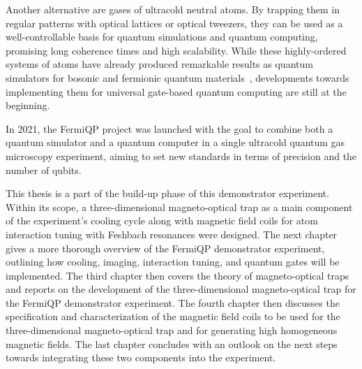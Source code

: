 Another alternative are gases of ultracold neutral atoms. By trapping them in regular patterns with optical lattices or optical tweezers, they can be used as a well-controllable basis for quantum simulations and quantum computing, promising long coherence times and high scalability. While these highly-ordered systems of atoms have already produced remarkable results as quantum simulators for bosonic and fermionic quantum materials~\cite{bloch_quantum_2012, gross_quantum_2017}, developments towards implementing them for universal gate-based quantum computing are still at the beginning.

In 2021, the FermiQP project was launched with the goal to combine both a quantum simulator and a quantum computer in a single ultracold quantum gas microscopy experiment, aiming to set new standards in terms of precision and the number of qubits. 

This thesis is a part of the build-up phase of this demonstrator experiment. Within its scope, a three-dimensional magneto-optical trap as a main component of the experiment's cooling cycle along with magnetic field coils for atom interaction tuning with Feshbach resonances were designed. The next chapter gives a more thorough overview of the FermiQP demonstrator experiment, outlining how cooling, imaging, interaction tuning, and quantum gates will be implemented. The third chapter then covers the theory of magneto-optical traps and reports on the development of the three-dimensional magneto-optical trap for the FermiQP demonstrator experiment. The fourth chapter then discusses the specification and characterization of the magnetic field coils to be used for the three-dimensional magneto-optical trap and for generating high homogeneous magnetic fields. The last chapter concludes with an outlook on the next steps towards integrating these two components into the experiment.


